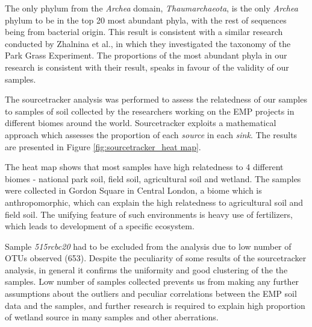 \documentclass[12pt,twocolumn]{article}
\begin{document}
\par
The only phylum from the \textit{Archea} domain, \textit{Thaumarchaeota}, is the only \textit{Archea} phylum to be in the top 20 most abundant phyla, with the rest of sequences being from bacterial origin. This result is consistent with a similar research conducted by Zhalnina et al.\cite{Zhalnina2014}, in which they investigated the taxonomy of the Park Grass Experiment. The proportions of the most abundant phyla in our research is consistent with their result, speaks in favour of the validity of our samples.
\par
The sourcetracker analysis was performed to assess the relatedness of our samples to samples of soil collected by the researchers working on the EMP projects in different biomes around the world. Sourcetracker exploits a mathematical approach which assesses the proportion of each \textit{source} in each \textit{sink}. The results are presented in Figure \ref{fig:sourcetracker_heat map}. 
\par
The heat map shows that most samples have high relatedness to 4 different biomes - national park soil, field soil, agricultural soil and wetland. The samples were collected in Gordon Square in Central London, a biome which is anthropomorphic, which can explain the high relatedness to agricultural soil and field soil. The unifying feature of such environments is heavy use of fertilizers, which leads to development of a specific ecosystem\cite{Zhalnina2014}.
\par
Sample \textit{515rcbc20} had to be excluded from the analysis due to low number of OTUs observed (653). Despite the peculiarity of some results of the sourcetracker analysis, in general it confirms the uniformity and good clustering of the the samples. Low number of samples collected prevents us from making any further assumptions about the outliers and peculiar correlations between the EMP soil data and the samples, and further research is required to explain high proportion of wetland source in many samples and other aberrations.
\end{document}
